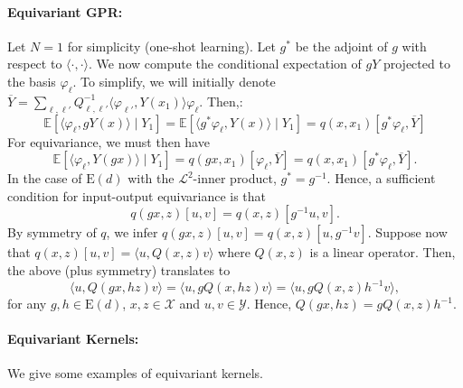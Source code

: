 \documentclass{article}
\newcommand{\Ltwo}{\mathcal{L}}
\newcommand{\euclid}[1]{\mathrm{E}(#1)}
\newcommand{\expectp}[1]{\mathbb{E}\left[#1\right]}
\newcommand{\yspace}{\mathcal{Y}}
\newcommand{\xspace}{\mathcal{X}}
\begin{document}
    \paragraph{Equivariant GPR:} Let $N=1$ for simplicity (one-shot learning). Let $g^*$ be the adjoint of $g$ with respect to $\langle \cdot,\cdot\rangle$.  We now compute the conditional expectation of $gY$ projected to the basis $\varphi_\ell$. To simplify, we will initially denote $\overline Y = \sum_{\ell,\ell'}Q^{-1}_{\ell,\ell'}\langle \varphi_{\ell'},Y(x_1)\rangle\varphi_{\ell}$. Then,:
    \[
        \expectp{\langle \varphi_\ell, gY(x)\rangle\mid Y_1} = \expectp{\langle g^*\varphi_\ell, Y(x)\rangle\mid Y_1} = q(x,x_1)[g^*\varphi_\ell, \overline{Y}]
    \]
    For equivariance, we must then have
    \[
        \expectp{\langle \varphi_\ell, Y(gx)\rangle\mid Y_1} =q(gx,x_1)[\varphi_{\ell},\overline Y] = q(x,x_1)\left[g^*\varphi_\ell, \overline Y\right].
    \]
    In the case of $\euclid{d}$ with the $\Ltwo^2$-inner product, $g^*=g^{-1}$. Hence, a sufficient condition for input-output equivariance is that 
    \[
    q(gx,z)[u,v]=q(x,z)[g^{-1}u,v].
    \]
    By symmetry of $q$, we infer $q(gx,z)[u, v]=q(x,z)[u, g^{-1}v]$. Suppose now that $q(x,z)[u, v] = \langle u, Q(x,z)v\rangle$ where $Q(x,z)$ is a linear operator. Then, the above (plus symmetry) translates to
    \[
        \langle u, Q(gx, hz)v\rangle = \langle u, gQ(x, hz)v\rangle =\langle u,gQ(x, z)h^{-1}v\rangle,
    \]
    for any $g,h \in \euclid{d}$, $x, z \in \xspace$ and $u,v\in \yspace$. Hence, $Q(gx,hz) = gQ(x,z)h^{-1}$. 

    \paragraph{Equivariant Kernels:}
    We give some examples of equivariant kernels.
    
\end{document}
